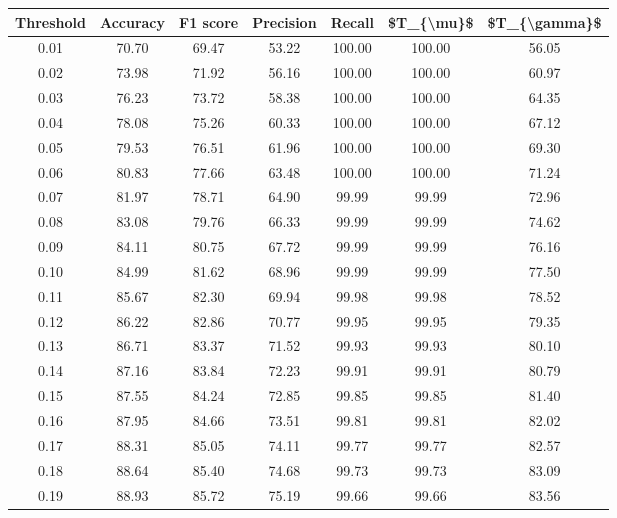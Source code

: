 \begin{tabular}{|c|c|c|c|c|c|c|}
\hline
 Threshold &  Accuracy &  F1 score &  Precision &  Recall &  \$T\_\{\textbackslash mu\}\$ &  \$T\_\{\textbackslash gamma\}\$ \\
\hline
      0.01 &     70.70 &     69.47 &      53.22 &  100.00 &     100.00 &         56.05 \\
      0.02 &     73.98 &     71.92 &      56.16 &  100.00 &     100.00 &         60.97 \\
      0.03 &     76.23 &     73.72 &      58.38 &  100.00 &     100.00 &         64.35 \\
      0.04 &     78.08 &     75.26 &      60.33 &  100.00 &     100.00 &         67.12 \\
      0.05 &     79.53 &     76.51 &      61.96 &  100.00 &     100.00 &         69.30 \\
      0.06 &     80.83 &     77.66 &      63.48 &  100.00 &     100.00 &         71.24 \\
      0.07 &     81.97 &     78.71 &      64.90 &   99.99 &      99.99 &         72.96 \\
      0.08 &     83.08 &     79.76 &      66.33 &   99.99 &      99.99 &         74.62 \\
      0.09 &     84.11 &     80.75 &      67.72 &   99.99 &      99.99 &         76.16 \\
      0.10 &     84.99 &     81.62 &      68.96 &   99.99 &      99.99 &         77.50 \\
      0.11 &     85.67 &     82.30 &      69.94 &   99.98 &      99.98 &         78.52 \\
      0.12 &     86.22 &     82.86 &      70.77 &   99.95 &      99.95 &         79.35 \\
      0.13 &     86.71 &     83.37 &      71.52 &   99.93 &      99.93 &         80.10 \\
      0.14 &     87.16 &     83.84 &      72.23 &   99.91 &      99.91 &         80.79 \\
      0.15 &     87.55 &     84.24 &      72.85 &   99.85 &      99.85 &         81.40 \\
      0.16 &     87.95 &     84.66 &      73.51 &   99.81 &      99.81 &         82.02 \\
      0.17 &     88.31 &     85.05 &      74.11 &   99.77 &      99.77 &         82.57 \\
      0.18 &     88.64 &     85.40 &      74.68 &   99.73 &      99.73 &         83.09 \\
      0.19 &     88.93 &     85.72 &      75.19 &   99.66 &      99.66 &         83.56 \\

\end{tabular}
